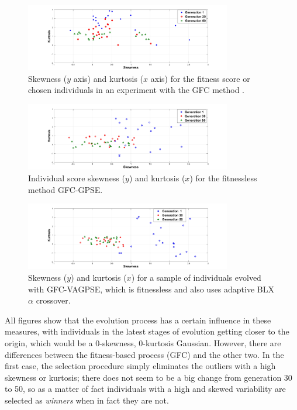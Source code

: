 \documentclass[10pt,journal,compsoc]{IEEEtran}
\begin{document}
\begin{figure}[!ht]	
	\begin{center}
		\includegraphics[width=9cm]{fig/GFC__.jpg}
		\caption{Skewness ($y$ axis) and kurtosis ($x$ axis)
                  for the fitness score or chosen individuals in an experiment with the
                  {\sf GFC} method \cite{salem_cig2018}.}
		\label{fig:gfcsk}	
	\end{center}	
\end{figure}
\begin{figure}[!ht]	
	\begin{center}
		\includegraphics[width=9cm]{fig/GFCRSE__.jpg}
		\caption{Individual score skewness ($y$) and kurtosis ($x$) for
                  the fitnessless method {\sf GFC-GPSE}.}
		\label{fig:gfcrsesk}	
	\end{center}	
\end{figure}
\begin{figure}[!ht]	
	\begin{center}
		\includegraphics[width=9cm]{fig/GFCVARSE__.jpg}
		\caption{Skewness ($y$) and kurtosis ($x$) for a
                  sample of individuals evolved with 
                  {\sf GFC-VAGPSE}, which is fitnessless and also uses
                  adaptive BLX$\alpha$ crossover.}
		\label{fig:gfcvarsesk}	
	\end{center}	
\end{figure}

All figures show that the evolution process has a certain influence in
these measures, with individuals in the latest stages of evolution
getting closer to the origin, which would be a 0-skewness, 0-kurtosis
Gaussian. However, there are differences between the fitness-based
process ({\sf GFC}) and the other two. In the first case, the
selection procedure simply eliminates the outliers with a high
skewness or kurtosis; there does not seem to be a big change from
generation 30 to 50, so as a matter of fact individuals with a high
and skewed variability are selected as {\em winners} when in fact they
are not.
\end{document}

